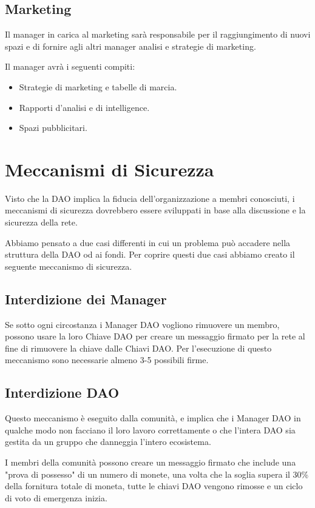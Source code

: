 \documentclass{article}
\begin{document}
\subsection{Marketing}

Il manager in carica al marketing sarà responsabile per il raggiungimento di nuovi spazi e di fornire agli altri manager analisi e strategie di marketing.

Il manager avrà i seguenti compiti:

\begin{itemize}
  \item Strategie di marketing e tabelle di marcia.
  \item Rapporti d'analisi e di intelligence.
  \item Spazi pubblicitari.
\end{itemize}

\section{Meccanismi di Sicurezza}

Visto che la DAO implica la fiducia dell'organizzazione a membri conosciuti, i meccanismi di sicurezza dovrebbero essere sviluppati in base alla discussione e la sicurezza della rete. 

Abbiamo pensato a due casi differenti in cui un problema può accadere nella struttura della DAO od ai fondi. Per coprire questi due casi abbiamo creato il seguente meccanismo di sicurezza.

\subsection{Interdizione dei Manager}

Se sotto ogni circostanza i Manager DAO vogliono rimuovere un membro, possono usare la loro Chiave DAO per creare un messaggio firmato per la rete al fine di rimuovere la chiave dalle Chiavi DAO. Per l'esecuzione di questo meccanismo sono necessarie almeno 3-5 possibili firme.

\subsection{Interdizione DAO}

Questo meccanismo è eseguito dalla comunità, e implica che i Manager DAO in qualche modo non facciano il loro lavoro correttamente o che l'intera DAO sia gestita da un gruppo che danneggia l'intero ecosistema. 

I membri della comunità possono creare un messaggio firmato che include una "prova di possesso" di un numero di monete, una volta che la soglia supera il 30\% della fornitura totale di moneta, tutte le chiavi DAO vengono rimosse e un ciclo di voto di emergenza inizia.
\end{document}
